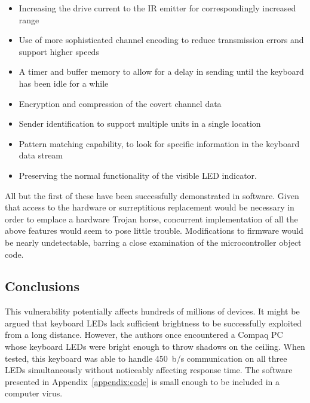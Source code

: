\documentclass{acmtrans2e}
\begin{document}
\begin{itemize}

\item Increasing the drive current to the IR emitter for correspondingly 
increased range

\item Use of more sophisticated channel encoding to reduce transmission 
errors and support higher speeds

\item A timer and buffer memory to allow for a delay in sending until 
the keyboard has been idle for a while

\item Encryption and compression of the covert channel data

\item Sender identification to support multiple units in a single 
location

\item Pattern matching capability, to look for specific information in 
the keyboard data stream

\item Preserving the normal functionality of the visible LED indicator.

\end{itemize}

All but the first of these have been successfully demonstrated in
software.  Given that access to the hardware or surreptitious replacement
would be necessary in order to emplace a hardware Trojan horse, concurrent 
implementation of all the above features would seem to pose little trouble.  
Modifications to firmware would be nearly undetectable, barring a close 
examination of the microcontroller object code.

\subsection{Conclusions}

This vulnerability potentially affects hundreds of millions of devices.
It might be argued that keyboard LEDs lack sufficient brightness to be 
successfully exploited from a long distance.  However, the authors once 
encountered a Compaq PC whose keyboard LEDs were bright enough to throw 
shadows on the ceiling.  When tested, this keyboard was able to handle 
450~b/s communication on all three LEDs simultaneously without 
noticeably affecting response time.  The software presented in
Appendix~\ref{appendix:code} is small enough to be included in a computer
virus.
\end{document}
